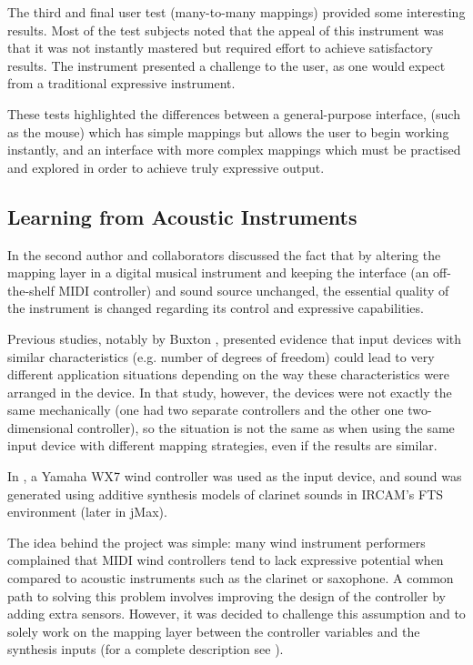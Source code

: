 The third and final user test (many-to-many mappings) provided some interesting
results.  Most of the test subjects noted that the appeal of this instrument was
that it was not instantly mastered but required effort to achieve satisfactory
results.  The instrument presented a challenge to the user, as one would expect
from a traditional expressive instrument.

These tests highlighted the differences between a general-purpose interface,
(such as the mouse) which has simple mappings but allows the user to begin
working instantly, and an interface with more complex mappings which must be
practised and explored in order to achieve truly expressive output.

\subsection{Learning from Acoustic Instruments}

In \cite{Rovan:1997} the second author and collaborators discussed the fact that by altering
the mapping layer in a digital musical instrument and keeping the interface (an
off-the-shelf MIDI controller) and sound source unchanged, the essential quality
of the instrument is changed regarding its control and expressive capabilities.

Previous studies, notably by Buxton \cite{Buxton:1986}, presented evidence that input devices
with similar characteristics (e.g. number of degrees of freedom) could lead to
very different application situations depending on the way these characteristics
were arranged in the device. In that study, however, the devices were not exactly
the same mechanically (one had two separate controllers and the other one
two-dimensional controller), so the situation is not the same as when using the
same input device with different mapping strategies, even if the results are
similar.

In \cite{Rovan:1997}, a Yamaha WX7 wind controller was used as the input device, and sound
was generated using additive synthesis models of clarinet sounds in IRCAM's FTS
environment (later in jMax).

The idea behind the project was simple: many wind instrument performers
complained that MIDI wind controllers tend to lack expressive potential when
compared to acoustic instruments such as the clarinet or saxophone.  A common
path to solving this problem involves improving the design of the controller by
adding extra sensors.  However, it was decided to challenge this assumption and
to solely work on the mapping layer between the controller variables and the
synthesis inputs (for a complete description see \cite{Rovan:1997}).

